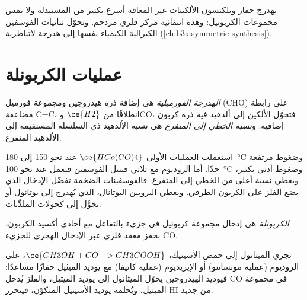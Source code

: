 يهدرج حفاز ويلكنسون الألكينات غير المعاقة أسرع بكثير من
المستبدلة ولا يمس مجموعات الكربونيل: وهذه انتقائية
مركز فلزي مزدحم. وتحوّل ثنائيات الفوسفين الكيرالية الكيمياء نفسها إلى
هدرجة لاتناظرية (\cref{ch:b3:asymmetric-synthesis}).

\section{عمليات الكربونلة}

\begin{definition}\label{def:b3:homogeneous-catalysis:hydroformylation}
\emph{الهدرجة الفورميلية} هي إضافة ذرة هيدروجين
ومجموعة فورميل (CHO) على رابطة مضاعفة C=C، انطلاقًا من $\ce{H2}$ وCO، فتحوّل
الألكين إلى ألدهيد فيه ذرة كربون إضافية. و\emph{نسبة الخطي إلى
المتفرع} هي نسبة الألدهيد ذي السلسلة المستقيمة
إلى الألدهيد المتفرع.
\end{definition}

استعملت العمليات الأولى $\ce{HCo(CO)4}$ عند نحو 150 إلى \qty{180}{\celsius} وضغوط
مرتفعة جدًا. أما الروديوم مع ثلاثي فينيل الفوسفين فيعمل عند نحو \qty{100}{\celsius} 
وضغوط أدنى بكثير، ويعطي نسبة أعلى من الخطي إلى المتفرع: فالفوسفينات
الضخمة تفضّل الإدخال الذي يضع الفلز على الكربون الطرفي.
ويعطي البروبين البوتانال، الذي يُهدرج إلى بوتانول أو يحوَّل إلى كحولات
الملدِّنات.

\begin{definition}[الكربونلة]\label{def:b3:homogeneous-catalysis:carbonylation}
\emph{الكربونلة} هي إدخال مجموعة كربونيل
في جزيء بالتفاعل مع أحادي أكسيد الكربون، بحفز معقد فلزي
عبر الإدخال الهجري للجزيء CO.
\end{definition}

تجري  الميثانول إلى حمض الأسيتيك، $\ce{CH3OH + CO -> CH3COOH}$، على
الروديوم (عملية مونسانتو) أو الإيريديوم (عملية كاتيفا) مع يوديد الميثيل
حفازًا مساعدًا: فيوديد الهيدروجين يحوّل الميثانول إلى يوديد الميثيل، والفلز
يُدخل CO في مجموعة الميثيل، ويُحلمه يوديد الأسيتيل المتكوّن،
فيتحرر HI من جديد.

